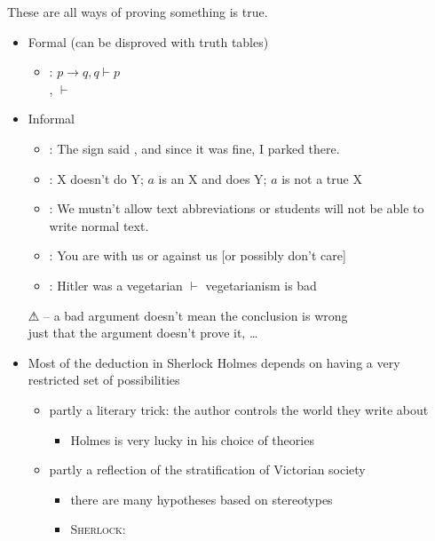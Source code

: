 \documentclass[a4paper,landscape,headrule,footrule,xetex]{foils}
\begin{document}
These are all ways of proving something is true.


\begin{itemize}
\item Formal (can be disproved with truth tables)
  \begin{itemize}
  \item {}: $p \rightarrow q, q \vdash p$
    \\ ,  $\vdash$ 
  \end{itemize}
\item Informal
  \begin{itemize}
  \item {}:  The sign said , and since it was fine, I parked there. 
  \item {}: X doesn't do Y; $a$ is an X and does Y; $a$ is not a true X
  \item {}: We mustn't allow text abbreviations or students will not be able to write normal text.
  \item {}: You are with us or against us [or possibly don't care]
  \item {}: Hitler was a vegetarian  $\vdash$ vegetarianism is bad
  \end{itemize}
  \begin{center}
     ⚠ -- a bad argument doesn't mean the conclusion is wrong\\
    just that the argument doesn't prove it, \ldots
  \end{center}

\end{itemize}



\begin{itemize}
\item Most of the deduction in Sherlock Holmes depends on having a
  very restricted set of possibilities
  \begin{itemize}
  \item partly a literary trick: the author controls the world they write about
    \begin{itemize}
    \item Holmes is very lucky in his choice of theories
    \end{itemize}
  \item partly a reflection of the stratification of Victorian society
    \begin{itemize}
    \item there are many hypotheses based on stereotypes
    \item \textsc{Sherlock:}  
    \end{itemize}
  \end{itemize}
\end{itemize}
\end{document}
